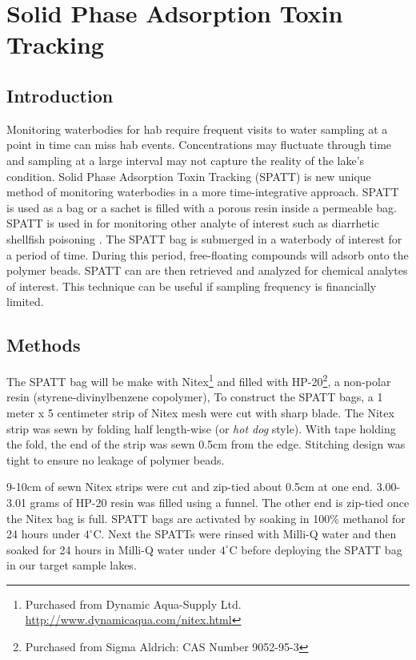 \chapter{Solid Phase Adsorption Toxin Tracking} \label{ch:spattss}

\section{Introduction}
Monitoring waterbodies for \gls{hab} require frequent visits to water sampling at a point in time can miss \gls{hab} events. Concentrations may fluctuate through time and sampling at a large interval may not capture the reality of the lake's condition. Solid Phase Adsorption Toxin Tracking (SPATT) is new unique method of monitoring waterbodies in a more time-integrative approach. SPATT is used as a bag or a sachet is filled with a porous resin inside a permeable bag.
SPATT is used in for monitoring other analyte of interest such as diarrhetic shellfish poisoning \cite{mackenzie_solid_2004}. %
The SPATT bag  is submerged in a waterbody of interest for a period of time. During this period, free-floating compounds will adsorb onto the polymer beads.  SPATT can are then retrieved and analyzed for chemical analytes of interest. This technique can be useful if sampling frequency is financially limited.

\section{Methods}

The SPATT bag will be make with Nitex\footnote{Purchased from Dynamic Aqua-Supply Ltd.  \url{http://www.dynamicaqua.com/nitex.html}} and filled with HP-20\footnote{Purchased from Sigma Aldrich: CAS Number 9052-95-3}, a non-polar resin (styrene-divinylbenzene copolymer),
To construct the SPATT bags, a 1 meter x 5 centimeter strip of Nitex mesh were cut with sharp blade. The Nitex strip was sewn by folding half length-wise (or \emph{hot dog} style). With tape holding the fold, the end of the strip was sewn 0.5cm from the edge. Stitching design was tight to ensure no leakage of polymer beads.

9-10cm of sewn Nitex strips were cut and zip-tied about 0.5cm at one end. 3.00-3.01 grams of HP-20 resin was filled using a funnel. The other end is zip-tied once the Nitex bag is full. SPATT bags are activated by soaking in 100\% methanol for 24 hours under $4^\circ$C. Next the SPATTs were rinsed with Milli-Q water and then soaked for 24 hours in Milli-Q water under $4^\circ$C before deploying the SPATT bag in our target sample lakes.

